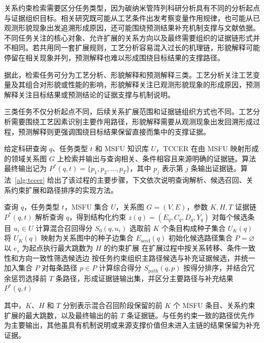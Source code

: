 关系约束检索需要区分任务类型，因为碳纳米管阵列科研分析具有不同的分析起点与证据组织目标。相关研究既可能从工艺条件出发考察变量作用规律，也可能从已观测形貌现象出发追溯形成原因，还可能围绕预测结果补充机制支撑与文献依据。不同任务关注的核心对象、允许扩展的关系方向以及最终需要组织的证据链形式并不相同。若共用同一套扩展规则，工艺分析容易混入过长的机理链，形貌解释可能停留在相关现象并列，预测解释也难以形成围绕目标结果的支撑路径。

据此，检索任务可分为工艺分析、形貌解释和预测解释三类。工艺分析关注工艺变量及其组合对形貌或性能的影响，形貌解释关注已观测形貌现象的形成原因，预测解释关注目标结果或预测结论的证据支撑与机制说明。

三类任务不仅分析起点不同，后续关系扩展范围和证据链组织方式也不同。工艺分析需要围绕工艺因素识别主要作用路径，形貌解释需要从观测现象出发回溯形成过程，预测解释则更强调围绕目标结果保留直接而集中的支撑证据。

给定科研查询 $q$、任务类型 $t$ 和 MSFU 知识库 $U$，TCCER 在由 MSFU 映射形成的领域关系图 $G$ 上检索并输出与查询相关、条件相容且来源明确的证据链。算法最终输出记为 $P^{*}(q,t)=\{p_1,p_2,\ldots,p_T\}$，其中 $p_j$ 表示第 $j$ 条输出证据链。算法~\ref{alg:tccer} 给出了该过程的主要步骤，下文依次说明查询解析、候选召回、关系约束扩展和路径排序的实现方法。

\begin{algorithm}[htbp]
\caption{面向科研任务的关系约束检索算法（TCCER）}
\label{alg:tccer}
\begin{algorithmic}[1]
\Require 查询 $q$，任务类型 $t$，MSFU 集合 $U$，关系图 $G=(V,E)$，参数 $K,H,T$
\Ensure 证据链 $P^{*}(q,t)$
\State 解析查询 $q$，得到结构化约束 $z(q)=(E_q,C_q,D_q,Y_q)$
\State 对每个候选条目 $u_i\in U$ 计算混合召回得分 $S_0(q,u_i)$
\State 选取前 $K$ 个条目构成种子集合 $U_K(q)$
\State 将 $U_K(q)$ 映射为关系图中的种子边集合 $E_{\mathrm{seed}}(q)$
\State 初始化候选路径集合 $P=\varnothing$
    \State 以 $e_s$ 为起点执行最大跳数为 $H$ 的约束扩展
    \State 在扩展过程中按关系转移、条件一致性和方向一致性筛选候选边
    \State 按任务约束组织主路径候选与补充证据候选，并统一加入集合 $P$
\EndFor
\State 对每条路径 $p\in P$ 计算综合得分 $S_{\mathrm{path}}(q,p)$
\State 按得分排序，并结合冗余惩罚选择前 $T$ 条路径，形成证据链输出集，并区分主要路径与补充结果
\State \Return $P^{*}(q,t)$
\end{algorithmic}
\end{algorithm}

其中，$K$、$H$ 和 $T$ 分别表示混合召回阶段保留的前 $K$ 个 MSFU 条目、关系约束扩展的最大跳数，以及最终输出的前 $T$ 条证据链。与任务约束一致的路径优先作为主要输出，其他虽具有机制说明或来源支撑价值但未进入主链的结果保留为补充证据。

